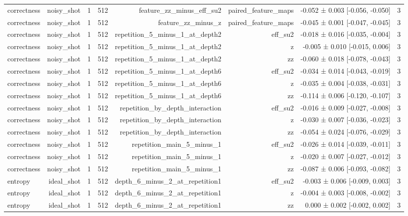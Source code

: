 \begin{table}
\begin{tabular}{lrrrrrrr}
correctness & noisy\_shot & 1 & 512 & feature\_zz\_minus\_eff\_su2 & paired\_feature\_maps & -0.052 ± 0.003 [-0.056, -0.050] & 3 \\
correctness & noisy\_shot & 1 & 512 & feature\_zz\_minus\_z & paired\_feature\_maps & -0.045 ± 0.001 [-0.047, -0.045] & 3 \\
correctness & noisy\_shot & 1 & 512 & repetition\_5\_minus\_1\_at\_depth2 & eff\_su2 & -0.018 ± 0.016 [-0.035, -0.004] & 3 \\
correctness & noisy\_shot & 1 & 512 & repetition\_5\_minus\_1\_at\_depth2 & z & -0.005 ± 0.010 [-0.015, 0.006] & 3 \\
correctness & noisy\_shot & 1 & 512 & repetition\_5\_minus\_1\_at\_depth2 & zz & -0.060 ± 0.018 [-0.078, -0.043] & 3 \\
correctness & noisy\_shot & 1 & 512 & repetition\_5\_minus\_1\_at\_depth6 & eff\_su2 & -0.034 ± 0.014 [-0.043, -0.019] & 3 \\
correctness & noisy\_shot & 1 & 512 & repetition\_5\_minus\_1\_at\_depth6 & z & -0.035 ± 0.004 [-0.038, -0.031] & 3 \\
correctness & noisy\_shot & 1 & 512 & repetition\_5\_minus\_1\_at\_depth6 & zz & -0.114 ± 0.006 [-0.120, -0.107] & 3 \\
correctness & noisy\_shot & 1 & 512 & repetition\_by\_depth\_interaction & eff\_su2 & -0.016 ± 0.009 [-0.027, -0.008] & 3 \\
correctness & noisy\_shot & 1 & 512 & repetition\_by\_depth\_interaction & z & -0.030 ± 0.007 [-0.036, -0.023] & 3 \\
correctness & noisy\_shot & 1 & 512 & repetition\_by\_depth\_interaction & zz & -0.054 ± 0.024 [-0.076, -0.029] & 3 \\
correctness & noisy\_shot & 1 & 512 & repetition\_main\_5\_minus\_1 & eff\_su2 & -0.026 ± 0.014 [-0.039, -0.011] & 3 \\
correctness & noisy\_shot & 1 & 512 & repetition\_main\_5\_minus\_1 & z & -0.020 ± 0.007 [-0.027, -0.012] & 3 \\
correctness & noisy\_shot & 1 & 512 & repetition\_main\_5\_minus\_1 & zz & -0.087 ± 0.006 [-0.093, -0.082] & 3 \\
entropy & ideal\_shot & 1 & 512 & depth\_6\_minus\_2\_at\_repetition1 & eff\_su2 & -0.003 ± 0.006 [-0.009, 0.003] & 3 \\
entropy & ideal\_shot & 1 & 512 & depth\_6\_minus\_2\_at\_repetition1 & z & -0.004 ± 0.003 [-0.008, -0.002] & 3 \\
entropy & ideal\_shot & 1 & 512 & depth\_6\_minus\_2\_at\_repetition1 & zz & 0.000 ± 0.002 [-0.002, 0.002] & 3 \\

\end{tabular}
\end{table}
